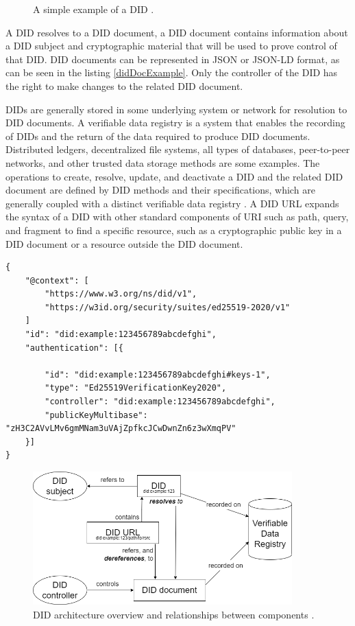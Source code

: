 \begin{figure}[h!]
    \centering
    
    \caption{A simple example of a DID \cite{didW3C}.}
    \label{didExample}
\end{figure}

A DID resolves to a DID document, a DID document contains information about a DID subject and cryptographic material that will be used to prove control of that DID. DID documents can be represented in JSON \cite{json-rfc3986} or JSON-LD \cite{json-ld} format, as can be seen in the listing \ref{didDocExample}. Only the controller of the DID has the right to make changes to the related DID document. 

DIDs are generally stored in some underlying system or network for resolution to DID documents. A verifiable data registry is a system that enables the recording of DIDs and the return of the data required to produce DID documents. Distributed ledgers, decentralized file systems, all types of databases, peer-to-peer networks, and other trusted data storage methods are some examples. The operations to create, resolve, update, and deactivate a DID and the related DID document are defined by DID methods and their specifications, which are generally coupled with a distinct verifiable data registry \cite{didW3C}. 
A DID URL expands the syntax of a DID with other standard components of URI such as path, query, and fragment to find a specific resource, such as a cryptographic public key in a DID document or a resource outside the DID document. \\

\begin{lstlisting}[caption={Example of a simple DID document from \cite{didW3C}.},captionpos=b,style=json, label={didDocExample},frame=single]
{
    "@context": [
        "https://www.w3.org/ns/did/v1",
        "https://w3id.org/security/suites/ed25519-2020/v1"
    ]
    "id": "did:example:123456789abcdefghi",
    "authentication": [{

        "id": "did:example:123456789abcdefghi#keys-1",
        "type": "Ed25519VerificationKey2020",
        "controller": "did:example:123456789abcdefghi",
        "publicKeyMultibase": "zH3C2AVvLMv6gmMNam3uVAjZpfkcJCwDwnZn6z3wXmqPV"
    }]
}
\end{lstlisting}

\begin{figure}[h!]
    \centering
    \includegraphics[width=10cm]{./chapters/images/did-overview.png}
    \caption{DID architecture overview and relationships between components \cite{didW3C}.}
    \label{didOverview}
\end{figure}

